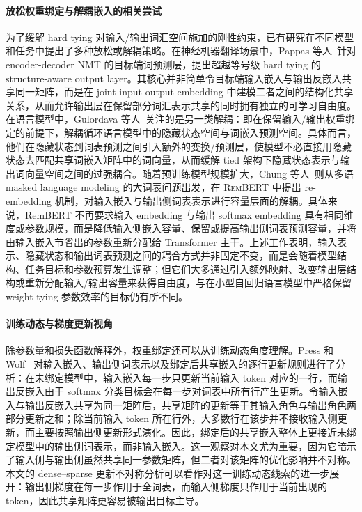 \documentclass{article}
\theoremstyle{plain}
\theoremstyle{definition}
\theoremstyle{remark}
\begin{document}
\paragraph{放松权重绑定与解耦嵌入的相关尝试}
为了缓解 hard tying 对输入/输出词汇空间施加的刚性约束，已有研究在不同模型和任务中提出了多种放松或解耦策略。在神经机器翻译场景中，Pappas 等人~\cite{pappas2018beyond}针对 encoder-decoder NMT 的目标端词预测层，提出超越等号级 hard tying 的 structure-aware output layer。其核心并非简单令目标端输入嵌入与输出反嵌入共享同一矩阵，而是在 joint input-output embedding 中建模二者之间的结构化共享关系，从而允许输出层在保留部分词汇表示共享的同时拥有独立的可学习自由度。在语言模型中，Gulordava 等人~\cite{gulordava2018improving}关注的是另一类解耦：即在保留输入/输出权重绑定的前提下，解耦循环语言模型中的隐藏状态空间与词嵌入预测空间。具体而言，他们在隐藏状态到词表预测之间引入额外的变换/预测层，使模型不必直接用隐藏状态去匹配共享词嵌入矩阵中的词向量，从而缓解 tied 架构下隐藏状态表示与输出词向量空间之间的过强耦合。随着预训练模型规模扩大，Chung 等人~\cite{chung2021reembedding}则从多语 masked language modeling 的大词表问题出发，在 \textsc{RemBERT} 中提出 re-embedding 机制，对输入嵌入与输出侧词表表示进行容量层面的解耦。具体来说，RemBERT 不再要求输入 embedding 与输出 softmax embedding 具有相同维度或参数规模，而是降低输入侧嵌入容量、保留或提高输出侧词表预测容量，并将由输入嵌入节省出的参数重新分配给 Transformer 主干。上述工作表明，输入表示、隐藏状态和输出词表预测之间的耦合方式并非固定不变，而是会随着模型结构、任务目标和参数预算发生调整；但它们大多通过引入额外映射、改变输出层结构或重新分配输入/输出容量来获得自由度，与在小型自回归语言模型中严格保留 weight tying 参数效率的目标仍有所不同。

\paragraph{训练动态与梯度更新视角}
除参数量和损失函数解释外，权重绑定还可以从训练动态角度理解。Press 和 Wolf~\cite{press2017using} 对输入嵌入、输出侧词表示以及绑定后共享嵌入的逐行更新规则进行了分析：在未绑定模型中，输入嵌入每一步只更新当前输入 token 对应的一行，而输出反嵌入由于 softmax 分类目标会在每一步对词表中所有行产生更新。令输入嵌入与输出反嵌入共享为同一矩阵后，共享矩阵的更新等于其输入角色与输出角色两部分更新之和；除当前输入 token 所在行外，大多数行在该步并不接收输入侧更新，而主要按照输出侧更新形式演化。因此，绑定后的共享嵌入整体上更接近未绑定模型中的输出侧词表示，而非输入嵌入。这一观察对本文尤为重要，因为它暗示了输入侧与输出侧虽然共享同一参数矩阵，但二者对该矩阵的优化影响并不对称。本文的 dense--sparse 更新不对称分析可以看作对这一训练动态线索的进一步展开：输出侧梯度在每一步作用于全词表，而输入侧梯度只作用于当前出现的 token，因此共享矩阵更容易被输出目标主导。
\end{document}
